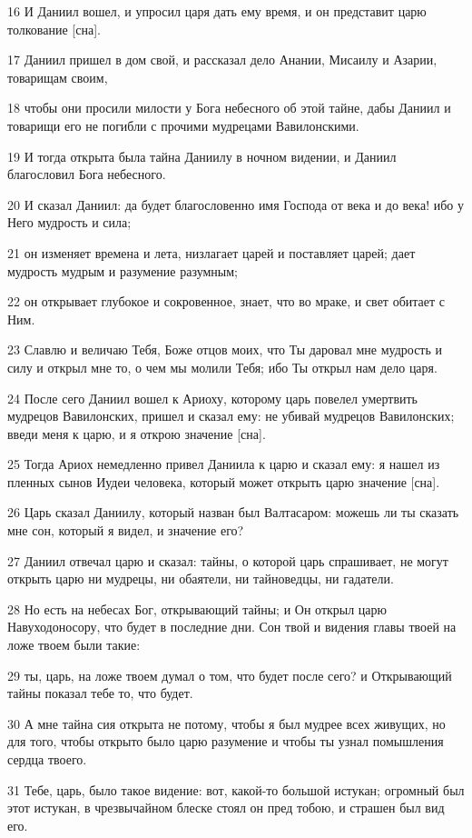 \par 16 И Даниил вошел, и упросил царя дать ему время, и он представит царю толкование [сна].
\par 17 Даниил пришел в дом свой, и рассказал дело Анании, Мисаилу и Азарии, товарищам своим,
\par 18 чтобы они просили милости у Бога небесного об этой тайне, дабы Даниил и товарищи его не погибли с прочими мудрецами Вавилонскими.
\par 19 И тогда открыта была тайна Даниилу в ночном видении, и Даниил благословил Бога небесного.
\par 20 И сказал Даниил: да будет благословенно имя Господа от века и до века! ибо у Него мудрость и сила;
\par 21 он изменяет времена и лета, низлагает царей и поставляет царей; дает мудрость мудрым и разумение разумным;
\par 22 он открывает глубокое и сокровенное, знает, что во мраке, и свет обитает с Ним.
\par 23 Славлю и величаю Тебя, Боже отцов моих, что Ты даровал мне мудрость и силу и открыл мне то, о чем мы молили Тебя; ибо Ты открыл нам дело царя.
\par 24 После сего Даниил вошел к Ариоху, которому царь повелел умертвить мудрецов Вавилонских, пришел и сказал ему: не убивай мудрецов Вавилонских; введи меня к царю, и я открою значение [сна].
\par 25 Тогда Ариох немедленно привел Даниила к царю и сказал ему: я нашел из пленных сынов Иудеи человека, который может открыть царю значение [сна].
\par 26 Царь сказал Даниилу, который назван был Валтасаром: можешь ли ты сказать мне сон, который я видел, и значение его?
\par 27 Даниил отвечал царю и сказал: тайны, о которой царь спрашивает, не могут открыть царю ни мудрецы, ни обаятели, ни тайноведцы, ни гадатели.
\par 28 Но есть на небесах Бог, открывающий тайны; и Он открыл царю Навуходоносору, что будет в последние дни. Сон твой и видения главы твоей на ложе твоем были такие:
\par 29 ты, царь, на ложе твоем думал о том, что будет после сего? и Открывающий тайны показал тебе то, что будет.
\par 30 А мне тайна сия открыта не потому, чтобы я был мудрее всех живущих, но для того, чтобы открыто было царю разумение и чтобы ты узнал помышления сердца твоего.
\par 31 Тебе, царь, было такое видение: вот, какой-то большой истукан; огромный был этот истукан, в чрезвычайном блеске стоял он пред тобою, и страшен был вид его.
